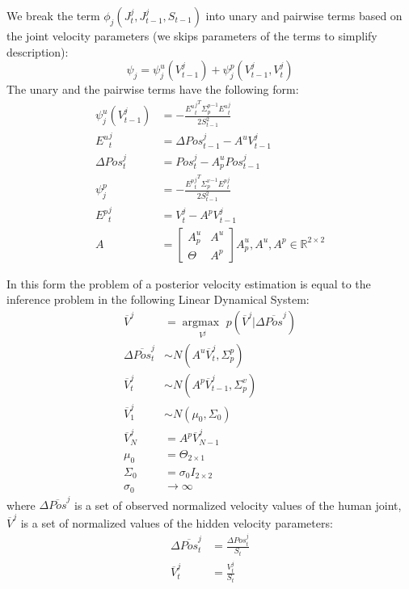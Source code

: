 We break the term $\phi_j(J_t^j, J_{t-1}^j, S_{t-1})$ into unary and pairwise terms based on the joint velocity parameters (we skips parameters of the terms to simplify description):
\[
\psi_j = \psi_j^u(V_{t-1}^j) + \psi_j^p(V_{t-1}^j, V_t^j)
\]
The unary and the pairwise terms have the following form:
\begin{equation*}
	\begin{aligned}
		\psi_j^u(V_{t-1}^j) &=
			-\frac{{{E^u}_{t}^j}^T {\Sigma_p^p}^{-1} {E^u}_{t}^j} {2 S_{t-1}^2} \\ 
		{E^u}_{t}^j &= \Delta Pos_{t-1}^j - A^u V_{t-1}^j \\
		\Delta Pos_{t}^j &= Pos_{t}^j - A_p^u Pos_{t-1}^j \\
		\psi_j^p &=
			-\frac{{{E^p}_{t}^j}^T {\Sigma_p^v}^{-1} {E^p}_{t}^j} {2 S_{t-1}^2} \\ 
		{E^p}_{t}^j &= V_t^j - A^p V_{t-1}^j \\
		A &= \left[
			\begin{array}{c|c}
				A_p^u  & A^u \\ \hline
				\Theta & A^p
			\end{array}
			\right]
			A_p^u, A^u, A^p \in \mathbb{R}^{2 \times 2}
	\end{aligned}
\end{equation*}

In this form the problem of a posterior velocity estimation is equal to the inference problem in the following Linear Dynamical System:
\begin{equation*}
	\begin{aligned}
		\overline{V}^j &= \underset{V^j}{\mathop{argmax\:}} {p\left(\overline{V}^j | \Delta \overline{Pos}^j
	\right)} \\ 
		\Delta \overline{Pos}_t^j &\sim N(A^u \overline{V}_t^j, \Sigma_p^p) \\
		\overline{V}_t^j &\sim N(A^p \overline{V}_{t-1}^j, \Sigma_p^v) \\
		\overline{V}_1^j &\sim N(\mu_0, \Sigma_0) \\
		\overline{V}_N^j &= A^p \overline{V}_{N-1}^j \\
		\mu_0 &= \Theta_{2\times1} \\
		\Sigma_0 &= \sigma_0 I_{2\times2} \\
		\sigma_0 &\rightarrow \infty
	\end{aligned}
\end{equation*}
where $\Delta \overline{Pos}^j$ is a set of observed normalized velocity values of the human joint, $\overline{V}^j$ is a set of normalized values of the hidden velocity parameters:
\begin{equation*}
	\begin{aligned}
		\Delta \overline{Pos}_t^j &= \frac {\Delta Pos_t^j} {S_t} \\
		\overline{V}_t^j &= \frac {V_t^j} {S_t} \\
	\end{aligned}
\end{equation*}

